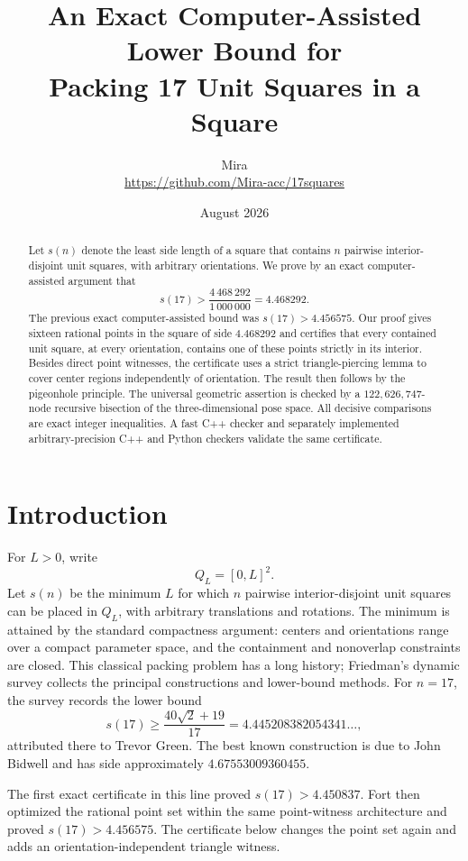 \documentclass[11pt]{article}
\title{An Exact Computer-Assisted Lower Bound for\\Packing 17 Unit Squares in a Square}
\author{Mira\\\small \url{https://github.com/Mira-acc/17squares}}
\date{August 2026}
\theoremstyle{definition}
\theoremstyle{remark}
\newcommand{\Q}{Q}
\begin{document}
\maketitle

\begin{abstract}
Let $s(n)$ denote the least side length of a square that contains $n$ pairwise
interior-disjoint unit squares, with arbitrary orientations.  We prove by an
exact computer-assisted argument that
\[
  s(17) > \frac{4\,468\,292}{1\,000\,000}=4.468292.
\]
The previous exact computer-assisted bound was $s(17)>4.456575$.  Our proof
gives sixteen rational points in the square of side $4.468292$ and certifies
that every contained unit square, at every orientation, contains one of these
points strictly in its interior.  Besides direct point witnesses, the
certificate uses a strict triangle-piercing lemma to cover center regions
independently of orientation.  The result then follows by the pigeonhole
principle.  The universal geometric assertion is checked by a
$122{,}626{,}747$-node recursive bisection of the three-dimensional pose space.
All decisive comparisons are exact integer inequalities.  A fast C++ checker
and separately implemented arbitrary-precision C++ and Python checkers validate
the same certificate.
\end{abstract}

\section{Introduction}

For $L>0$, write
\[
  \Q_L=[0,L]^2.
\]
Let $s(n)$ be the minimum $L$ for which $n$ pairwise interior-disjoint unit
squares can be placed in $\Q_L$, with arbitrary translations and rotations.
The minimum is attained by the standard compactness argument: centers and
orientations range over a compact parameter space, and the containment and
nonoverlap constraints are closed.  This classical packing problem has a long
history; Friedman's dynamic survey
collects the principal constructions and lower-bound methods\cite{Friedman2009}.
For $n=17$, the survey records the lower bound
\[
  s(17)\ge \frac{40\sqrt2+19}{17}
  =4.445208382054341\ldots,
\]
attributed there to Trevor Green.  The best known construction is due to John
Bidwell and has side approximately
$4.67553009360455$\cite{Friedman2009,Ellsworth2026}.

The first exact certificate in this line proved $s(17)>4.450837$.  Fort then
optimized the rational point set within the same point-witness architecture and
proved $s(17)>4.456575$\cite{Fort2026}.  The certificate below changes the point
set again and adds an orientation-independent triangle witness.
\end{document}
